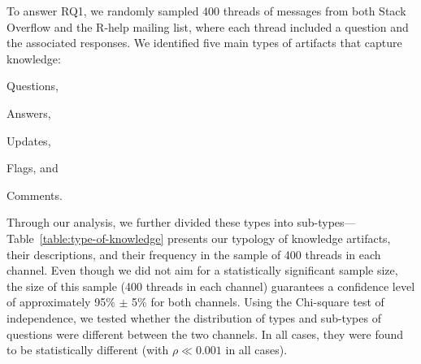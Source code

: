 \documentclass[smallextended]{svjour3}       %
\newcommand{\SO}{Stack Overflow\xspace}
\newcommand{\RH}{R-help\xspace}
\begin{document}
To answer RQ1, we randomly sampled 400 threads of messages from both \SO and the \RH mailing list, where each thread included a question and the associated responses. We identified five main types of artifacts that capture knowledge:
\begin{enumerate*}[label=(\arabic*)]
\item Questions, 
\item Answers,
\item Updates,
\item Flags, and
\item Comments.
\end{enumerate*}
Through our analysis, we further divided these types into sub-types---Table~\ref{table:type-of-knowledge} presents our typology of knowledge artifacts, their
descriptions, and their frequency in the sample of 400 threads in each channel. Even though we did not aim for a statistically significant sample size, the size of this sample
(400 threads in each channel) guarantees a confidence level of approximately 95\% $\pm$ 5\% for both channels. Using the Chi-square test of independence, we tested whether the distribution of types and sub-types of questions were different between the two channels.  In
all cases, they were found to be statistically different (with $\rho \ll 0.001$ in all cases).
\end{document}
